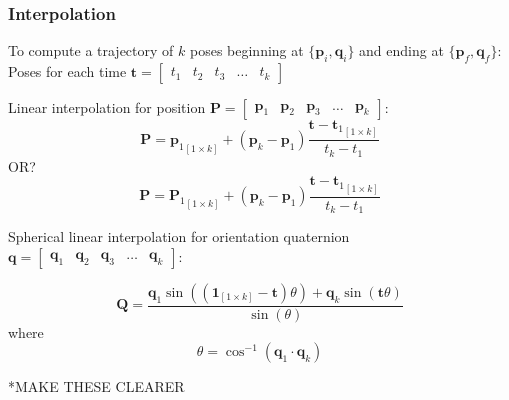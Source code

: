 \subsubsection{Interpolation}
To compute a trajectory of $k$ poses beginning at $\{\mathbf{p}_i,\mathbf{q}_i\}$ and ending at $\{\mathbf{p}_f,\mathbf{q}_f\}$:\\

Poses for each time $\mathbf{t} =
					\begin{bmatrix}
						t_1 & t_2 & t_3 & \dots & t_k
					\end{bmatrix}$

Linear interpolation for position $\mathbf{P}= \begin{bmatrix}
													\mathbf{p}_1 & \mathbf{p}_2 & \mathbf{p}_3 & \dots & \mathbf{p}_k
											   \end{bmatrix}$:
\begin{equation}
	\mathbf{P} = 
	{\mathbf{p}_1}_{[1 \times k]} + (\mathbf{p}_k - \mathbf{p}_1)\frac{\mathbf{t}-{\mathbf{t}_1}_{[1 \times k]}}{t_k - t_1}
\end{equation}
OR?
\begin{equation}
	\mathbf{P} = 
	{\mathbf{P}_1}_{[1 \times k]} + (\mathbf{p}_k - \mathbf{p}_1)\frac{\mathbf{t}-{\mathbf{t}_1}_{[1 \times k]}}{t_k - t_1}
\end{equation}


Spherical linear interpolation for orientation quaternion $\mathbf{q}= \begin{bmatrix}
													\mathbf{q}_1 & \mathbf{q}_2 & \mathbf{q}_3 & \dots & \mathbf{q}_k
												\end{bmatrix}$:

\begin{equation} \label{slerp}
	\mathbf{Q} = \frac{\mathbf{q}_1\sin((\mathbf{1}_{[1 \times k]}-\mathbf{t})\theta) + \mathbf{q}_k\sin(\mathbf{t}\theta)}{\sin(\theta)}
\end{equation}
where
\begin{equation}
	\theta = \cos^{-1}(\mathbf{q}_1 \cdot \mathbf{q}_k)
\end{equation}

*MAKE THESE CLEARER


